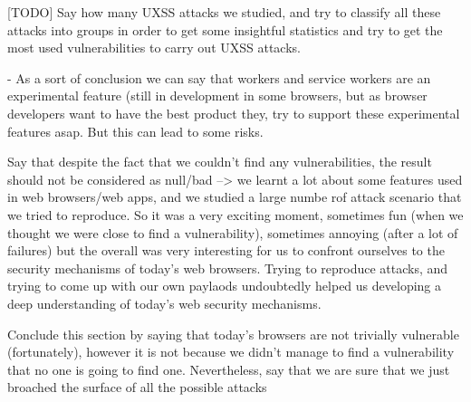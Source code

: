 \documentclass[journal]{IEEEtran}
\begin{document}
[TODO]
Say how many UXSS attacks we studied, and try to classify all these attacks into groups in order to get some insightful statistics and try to get the most used vulnerabilities to carry out UXSS attacks.

- As a sort of conclusion we can say that workers and service workers are an experimental feature (still in development in some browsers, but as browser developers want to have the best product they, try to support these experimental features asap. But this can lead to some risks.


Say that despite the fact that we couldn't find any vulnerabilities, the result should not be considered as null/bad --> we learnt a lot about some features used in web browsers/web apps, and we studied a large numbe rof attack scenario that we tried to reproduce. So it was a very exciting moment, sometimes fun (when we thought we were close to find a vulnerability), sometimes annoying (after a lot of failures) but the overall was very interesting for us to confront ourselves to the security mechanisms of today's web browsers. Trying to reproduce attacks, and trying to come up with our own paylaods undoubtedly helped us developing a deep understanding of today's web security mechanisms.

Conclude this section by saying that today's browsers are not trivially vulnerable (fortunately), however it is not because we didn't manage to find a vulnerability that no one is going to find one. 
Nevertheless, say that we are sure that we just broached the surface of all the possible attacks 



%
\end{document}

